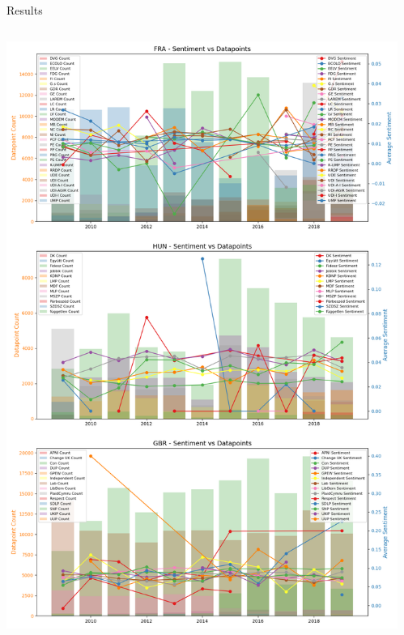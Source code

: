 \documentclass[8pt]{beamer}
\begin{document}
\begin{frame}{Results}
    \begin{columns}[T]
    \begin{column}{0.5\textwidth}
        \includegraphics[width=\textwidth]{img/sentiment_and_datapoints_3_rows.png}
    \end{column}
    \begin{column}{0.5\textwidth}

\end{column}
\end{columns}
\end{frame}
\end{document}
